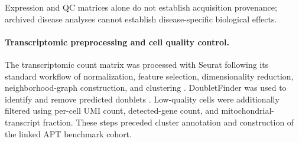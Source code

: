 

Expression and QC matrices alone do not establish acquisition provenance;
archived disease analyses cannot establish disease-specific biological effects.

\paragraph{Transcriptomic preprocessing and cell quality control.}
The transcriptomic count matrix was processed with Seurat following its standard
workflow of normalization, feature selection, dimensionality reduction,
neighborhood-graph construction, and clustering \citep{hao2021integrated}.
DoubletFinder was used to identify and remove predicted doublets
\citep{mcginnis2019doubletfinder}. Low-quality cells were additionally filtered
using per-cell UMI count, detected-gene count, and mitochondrial-transcript
fraction. These steps preceded cluster annotation and construction of the linked
APT benchmark cohort. 

